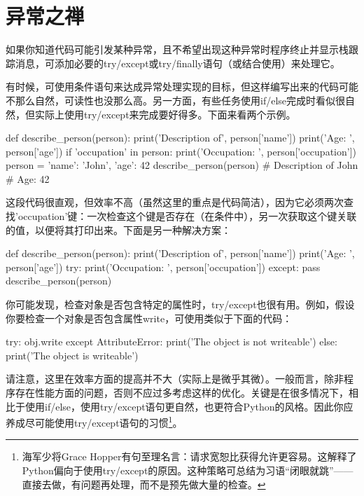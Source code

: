 \section{异常之禅}
如果你知道代码可能引发某种异常，且不希望出现这种异常时程序终止并显示栈跟踪消息，可添加必要的try/except或try/finally语句（或结合使用）来处理它。

有时候，可使用条件语句来达成异常处理实现的目标，但这样编写出来的代码可能不那么自然，可读性也没那么高。另一方面，有些任务使用if/else完成时看似很自然，但实际上使用try/except来完成要好得多。下面来看两个示例。

\begin{tcolorbox}[title=假设有一个字典，你要在指定的键存在时打印与之相关联的值，否则什么都不做。]
\begin{pyc}
def describe_person(person):
    print('Description of', person['name'])
    print('Age: ', person['age'])
    if 'occupation' in person:
        print('Occupation: ', person['occupation'])
person = {'name': 'John', 'age': 42}
describe_person(person)
# Description of John
# Age:  42
\end{pyc}

这段代码很直观，但效率不高（虽然这里的重点是代码简洁），因为它必须两次查找'occupation'键：一次检查这个键是否存在（在条件中），另一次获取这个键关联的值，以便将其打印出来。下面是另一种解决方案：

\begin{pyc}
def describe_person(person):
    print('Description of', person['name'])
    print('Age: ', person['age'])
    try:
        print('Occupation: ', person['occupation'])
    except:
        pass
describe_person(person)
\end{pyc}
\end{tcolorbox}

你可能发现，检查对象是否包含特定的属性时，try/except也很有用。例如，假设你要检查一个对象是否包含属性write，可使用类似于下面的代码：
\begin{pyc}
try:
    obj.write
except AttributeError:
    print('The object is not writeable')
else:
    print('The object is writeable')
\end{pyc}

请注意，这里在效率方面的提高并不大（实际上是微乎其微）。一般而言，除非程序存在性能方面的问题，否则不应过多考虑这样的优化。关键是在很多情况下，相比于使用if/else，使用try/except语句更自然，也更符合Python的风格。因此你应养成尽可能使用try/except语句的习惯\footnote{海军少将Grace Hopper有句至理名言：请求宽恕比获得允许更容易。这解释了Python偏向于使用try/except的原因。这种策略可总结为习语“闭眼就跳”——直接去做，有问题再处理，而不是预先做大量的检查。}。
